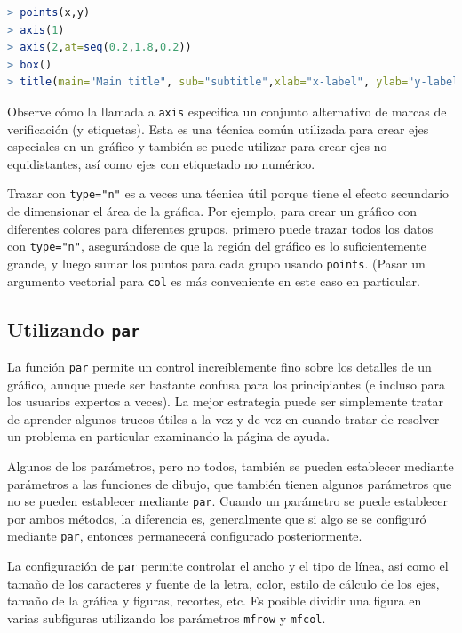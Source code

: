 \begin{lstlisting}[language=R]
> points(x,y)
> axis(1)
> axis(2,at=seq(0.2,1.8,0.2))
> box()
> title(main="Main title", sub="subtitle",xlab="x-label", ylab="y-label")
\end{lstlisting}

Observe cómo la llamada a \texttt{axis} especifica un conjunto alternativo de
marcas de verificación (y etiquetas). Esta es una técnica común utilizada para
crear ejes especiales en un gráfico y también se puede utilizar para crear ejes
no equidistantes, así como ejes con etiquetado no numérico.

Trazar con \texttt{type="n"} es a veces una técnica útil porque tiene el efecto
secundario de dimensionar el área de la gráfica. Por ejemplo, para crear un
gráfico con diferentes colores para diferentes grupos, primero puede trazar
todos los datos con \texttt{type="n"}, asegurándose de que la región del gráfico
es lo suficientemente grande, y luego sumar los puntos para cada grupo usando
\texttt{points}. (Pasar un argumento vectorial para \texttt{col} es más
conveniente en este caso en particular.

\subsection{Utilizando \texttt{par}}

La función \texttt{par} permite un control increíblemente fino sobre los
detalles de un gráfico, aunque puede ser bastante confusa para los principiantes
(e incluso para los usuarios expertos a veces). La mejor estrategia puede ser
simplemente tratar de aprender algunos trucos útiles a la vez y de vez en cuando
tratar de resolver un problema en particular examinando la página de ayuda.

Algunos de los parámetros, pero no todos, también se pueden establecer mediante
parámetros a las funciones de dibujo, que también tienen algunos parámetros que
no se pueden establecer mediante \texttt{par}.  Cuando un parámetro se puede
establecer por ambos métodos, la diferencia es, generalmente que si algo se se
configuró mediante \texttt{par}, entonces permanecerá configurado
posteriormente.

La configuración de \texttt{par} permite controlar el ancho y el tipo de línea,
así como el tamaño de los caracteres y fuente de la letra, color, estilo de
cálculo de los ejes, tamaño de la gráfica y figuras, recortes, etc. Es posible
dividir una figura en varias subfiguras utilizando los parámetros \texttt{mfrow}
y \texttt{mfcol}.


